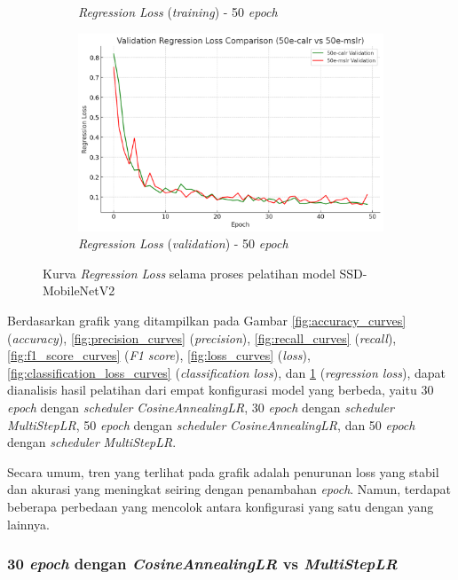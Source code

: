 \begin{figure}[htbp]
\begin{subfigure}{0.45\textwidth}
    \caption{\emph{Regression Loss} (\emph{training}) - 50 \emph{epoch}}
  \end{subfigure}
  \hfill
  \begin{subfigure}{0.45\textwidth}
    \includegraphics[width=\textwidth]{gambar/bab4-val-regloss-50e.png}
    \caption{\emph{Regression Loss} (\emph{validation}) - 50 \emph{epoch}}
  \end{subfigure}
  \caption{Kurva \emph{Regression Loss} selama proses pelatihan model SSD-MobileNetV2}
  \label{fig:regression_loss_curves}
\end{figure}      

Berdasarkan grafik yang ditampilkan pada Gambar \ref{fig:accuracy_curves} (\emph{accuracy}), \ref{fig:precision_curves} (\emph{precision}), \ref{fig:recall_curves} (\emph{recall}), \ref{fig:f1_score_curves} (\emph{F1 score}), \ref{fig:loss_curves} (\emph{loss}), \ref{fig:classification_loss_curves} (\emph{classification loss}), dan \ref{fig:regression_loss_curves} (\emph{regression loss}), dapat dianalisis hasil pelatihan dari empat konfigurasi model yang berbeda, yaitu 30 \emph{epoch} dengan \emph{scheduler} \emph{CosineAnnealingLR}, 30 \emph{epoch} dengan \emph{scheduler} \emph{MultiStepLR}, 50 \emph{epoch} dengan \emph{scheduler} \emph{CosineAnnealingLR}, dan 50 \emph{epoch} dengan \emph{scheduler} \emph{MultiStepLR}.

Secara umum, tren yang terlihat pada grafik adalah penurunan loss yang stabil dan akurasi yang meningkat seiring dengan penambahan \emph{epoch}. Namun, terdapat beberapa perbedaan yang mencolok antara konfigurasi yang satu dengan yang lainnya.

\subsubsection{30 \emph{epoch} dengan \emph{CosineAnnealingLR} vs \emph{MultiStepLR}}

